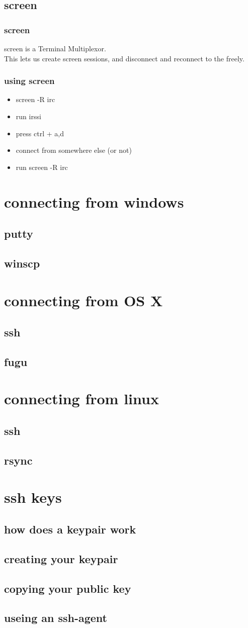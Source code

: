 \documentclass[hyperref={pdfpagelabels=false}]{beamer}
\begin{document}
\subsection{screen}
\frame
{
  \frametitle{screen}
  screen is a Terminal Multiplexor.\\
  This lets us create screen sessions, and disconnect and reconnect to the freely.
}
\frame
{
  \frametitle{using screen}
  \begin{itemize}
  \item{screen -R irc}
  \item{run irssi}
  \item{press ctrl + a,d}
  \item{connect from somewhere else (or not)}
  \item{run screen -R irc}
  \end{itemize}
}

\section{connecting from windows}
\subsection{putty}
\subsection{winscp}
\section{connecting from OS X}
\subsection{ssh}
\subsection{fugu}
\section{connecting from linux}
\subsection{ssh}
\subsection{rsync}
\section{ssh keys}
\subsection{how does a keypair work}
\subsection{creating your keypair}
\subsection{copying your public key}
\subsection{useing an ssh-agent}
\end{document}
